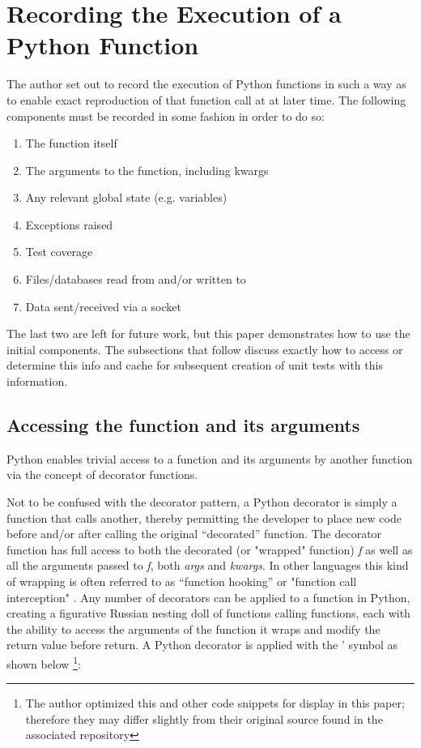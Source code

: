 \section{Recording the Execution of a Python Function}\label{sec:approach}
The author set out to record the execution of Python functions
in such a way as to enable exact reproduction of that 
function call at at later time.  The following components
must be recorded in some fashion in order to do so:
\begin{enumerate}
  \item The function itself
  \item The arguments to the function, including kwargs
  \item Any relevant global state (e.g. variables)
  \item Exceptions raised
  \item Test coverage
  \item Files/databases read from and/or written to
  \item Data sent/received via a socket
\end{enumerate}

The last two are left for future work, but this paper demonstrates how to use 
the initial components. The subsections that follow discuss exactly how to 
access or determine this info and cache for subsequent creation of unit tests
with this information.
\subsection{Accessing the function and its arguments}\label{sec:approach-internal-1}

Python enables trivial access to a function and 
its arguments by another function via the concept of 
decorator functions.

Not to be confused with the decorator pattern, a Python decorator is simply a 
function that calls another, thereby permitting the developer to place new code 
before and/or after calling the original “decorated” function.  
The decorator function has full access to both the decorated 
(or "wrapped" function) \textit{f} as well as all the 
arguments passed to \textit{f}, both \textit{args} and \textit{kwargs}.  In other 
languages this kind of wrapping is often referred to as 
“function hooking” or "function call interception" 
 \cite{kang2018function}. Any number of decorators can be applied to a function 
in Python, creating a figurative Russian nesting doll of
functions calling functions, each with the ability to access the 
arguments of the function it wraps and modify the 
return value before return. A Python decorator is applied with the \lq@\rq 
symbol as shown below \footnote{The author optimized this and other code snippets for display in 
this paper; therefore they may differ slightly from their original 
source found in the associated repository}:

